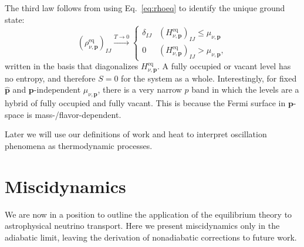 \documentclass[aps,prd,twocolumn,groupedaddress,preprintnumbers]{revtex4-2}
\begin{document}
The third law follows from using Eq.~\eqref{eq:rhoeq} to identify the unique ground state:
\begin{equation}
\left( \rho^\textrm{eq}_{\nu,\boldsymbol{p}} \right)_{IJ} \xrightarrow{T \rightarrow 0}  \begin{cases}
\delta_{IJ} & \left( H_{\nu,\boldsymbol{p}}^\textrm{eq} \right)_{IJ} \leq \mu_{\nu,\boldsymbol{p}} \\ 
0 & \left( H_{\nu,\boldsymbol{p}}^\textrm{eq} \right)_{IJ} > \mu_{\nu,\boldsymbol{p}}, \label{eq:degenerate}
\end{cases}
\end{equation}
written in the basis that diagonalizes $H_{\nu,\boldsymbol{p}}^\textrm{eq}$. A fully occupied or vacant level has no entropy, and therefore $S = 0$ for the system as a whole. Interestingly, for fixed $\boldsymbol{\hat{p}}$ and $\boldsymbol{p}$-independent $\mu_{\nu,\boldsymbol{p}}$, there is a very narrow $p$ band in which the levels are a hybrid of fully occupied and fully vacant. This is because the Fermi surface in $\boldsymbol{p}$-space is mass-/flavor-dependent.

Later we will use our definitions of work and heat to interpret oscillation phenomena as thermodynamic processes.
















\section{Miscidynamics\label{sec:misc}}

We are now in a position to outline the application of the equilibrium theory to astrophysical neutrino transport. Here we present miscidynamics only in the adiabatic limit, leaving the derivation of nonadiabatic corrections to future work. 
\end{document}
